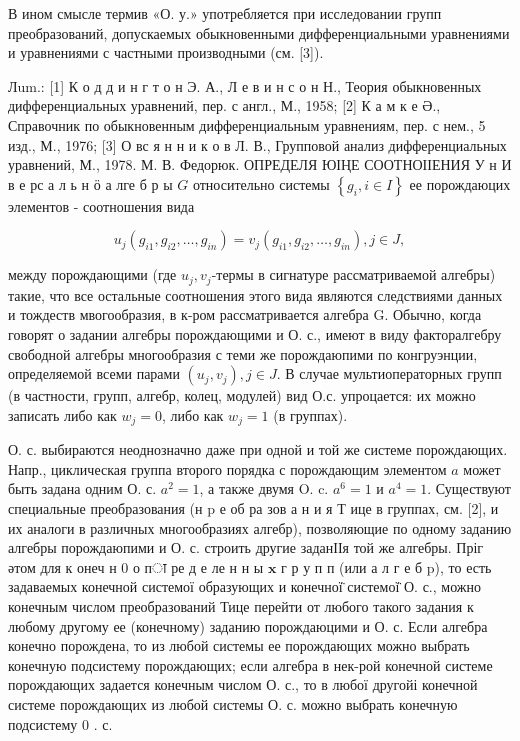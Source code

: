 \documentclass[10pt]{article}
\begin{document}
В ином смысле термив «О. у.» употребляется при исследовании групп преобразований, допускаемых обыкновенными дифференциальными уравнениями и уравнениями с частными производными (см. [3]).



Лum.: [1] К о д д и н г т о н Э. А., Л е в и н с о н Н., Теория обыкновенных дифференциальных уравнений, пер. с англ., М., 1958; [2] К а м к е Ә., Справочник по обыкновенным дифференциальным уравнениям, пер. с нем., 5 изд., М., 1976; [3] О вс я н н и к о в Л. В., Групповой анализ дифференциальных уравнений, М., 1978. М. В. Федорюк. ОПРЕДЕЛЯ ЮІҢЕ СООТНОІІЕНИЯ У н И в е рс а л ь н ӧ а лге б р ы $G$ относительно системы $\left\{g_{i}, i \in I\right\}$ ее порождаюцих элементов - соотношения вида



\[

u_{j}\left(g_{i 1}, g_{i 2}, \ldots, g_{i n}\right)=v_{j}\left(g_{i 1}, g_{i 2}, \ldots, g_{i n}\right), j \in J,

\]



между порождающими (где $u_{j}, v_{j}$-термы в сигнатуре рассматриваемой алгебры) такие, что все остальные соотношения этого вида являются следствиями данных и тождеств мвогообразия, в к-ром рассматривается алгебра G. Обычно, когда говорят о задании алгебры порождающими и О. с., имеют в виду факторалгебру свободной алгебры многообразия с теми же порождаюпими по конгруэнции, определяемой всеми парами $\left(u_{j}, v_{j}\right), j \in J$. В случае мультиоператорных групп (в частности, групп, алгебр, колец, модулей) вид О.с. упроцается: их можно записать либо как $w_{j}=0$, либо как $w_{j}=1$ (в группах).



О. с. выбираются неоднозначно даже при одной и той же системе порождающих. Напр., циклическая группа второго порядка с порождающим элементом $a$ может быть задана одним О. с. $a^{2}=1$, а также двумя O. c. $a^{6}=1$ и $a^{4}=1$. Существуют специальные преобразования (н $\mathrm{p}$ е об ра зов а н и я Т ице в группах, см. [2], и их аналоги в различных многообразиях алгебр), позволяющие по одному заданию алгебры порождаюпими и О. с. строить другие заданІІя той же алгебры. Пріг әтом для к онеч н 0 о пा ре д е ле н н ы $\mathbf{x}$ г р у п п (или а л г е б p), то есть задаваемых конечной системої образующих и конечної̈ системої̈ О. с., можно конечным числом преобразований Тице перейти от любого такого задания к любому другому ее (конечному) заданию порождаюцими и О. с. Если алгебра конечно порождена, то из любой системы ее порождающих можно выбрать конечную подсистему порождающих; если алгебра в нек-рой конечной системе порождающих задается конечным числом О. с., то в любої другойі конечной системе порождающих из любой системы О. с. можно выбрать конечную подсистему 0 . с.
\end{document}
